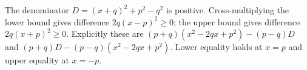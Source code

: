 The denominator $D=(x+q)^2+p^2-q^2$ is positive. Cross-multiplying the lower bound gives difference $2q(x-p)^2\ge0$; the upper bound gives difference $2q(x+p)^2\ge0$. Explicitly these are $(p+q)(x^2-2qx+p^2)-(p-q)D$ and $(p+q)D-(p-q)(x^2-2qx+p^2)$. Lower equality holds at $x=p$ and upper equality at $x=-p$.
